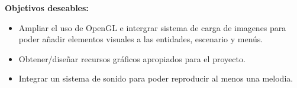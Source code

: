 \textbf{Objetivos deseables:}
\begin{itemize}
	\item Ampliar el uso de OpenGL e intergrar sistema de carga de imagenes para poder añadir
	elementos visuales a las entidades, escenario y menús.

	\item Obtener/diseñar recursos gráficos apropiados para el proyecto.

	\item Integrar un sistema de sonido para poder reproducir al menos una melodia.
\end{itemize}
